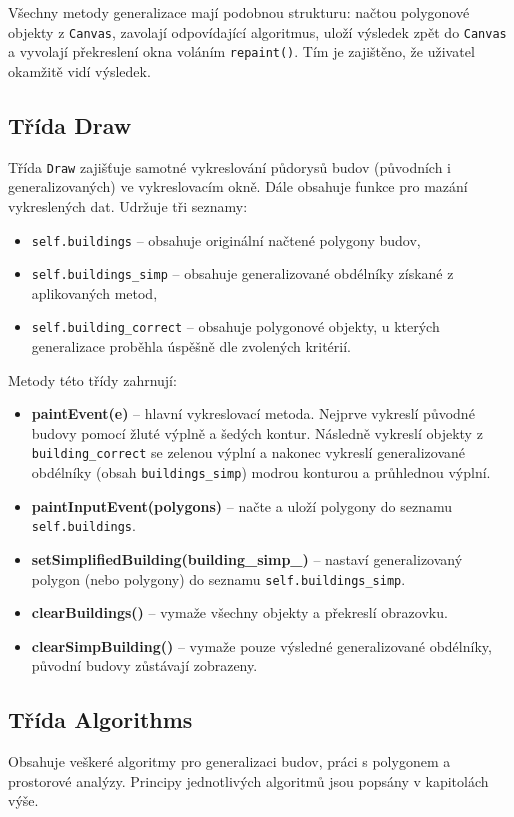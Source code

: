 \documentclass[a4paper,12pt]{article}
\begin{document}
Všechny metody generalizace mají podobnou strukturu: načtou polygonové objekty z \texttt{Canvas}, zavolají odpovídající algoritmus, uloží výsledek zpět do \texttt{Canvas} a vyvolají překreslení okna voláním \texttt{repaint()}. Tím je zajištěno, že uživatel okamžitě vidí výsledek.

\subsection{Třída Draw}
Třída \texttt{Draw} zajišťuje samotné vykreslování půdorysů budov (původních i generalizovaných) ve vykreslovacím okně. Dále obsahuje funkce pro mazání vykreslených dat. Udržuje tři seznamy: 
\begin{itemize}
    \item \texttt{self.buildings} – obsahuje originální načtené polygony budov,
    \item \texttt{self.buildings\_simp} – obsahuje generalizované obdélníky získané z aplikovaných metod,
    \item \texttt{self.building\_correct} – obsahuje polygonové objekty, u kterých generalizace proběhla úspěšně dle zvolených kritérií.
\end{itemize}

Metody této třídy zahrnují:
\begin{itemize}
    \item \textbf{paintEvent(e)} – hlavní vykreslovací metoda. Nejprve vykreslí původné budovy pomocí žluté výplně a šedých kontur. Následně vykreslí objekty z \texttt{building\_correct} se zelenou výplní a nakonec vykreslí generalizované obdélníky (obsah \texttt{buildings\_simp}) modrou konturou a průhlednou výplní.
    \item \textbf{paintInputEvent(polygons)} – načte a uloží polygony do seznamu \texttt{self.buildings}.
    \item \textbf{setSimplifiedBuilding(building\_simp\_)} – nastaví generalizovaný polygon (nebo polygony) do seznamu \texttt{self.buildings\_simp}.
    \item \textbf{clearBuildings()} – vymaže všechny objekty a překreslí obrazovku.
    \item \textbf{clearSimpBuilding()} – vymaže pouze výsledné generalizované obdélníky, původní budovy zůstávají zobrazeny.
\end{itemize}

\subsection{Třída Algorithms}
Obsahuje veškeré algoritmy pro generalizaci budov, práci s polygonem a prostorové analýzy. Principy jednotlivých algoritmů jsou popsány v kapitolách výše.
\end{document}
